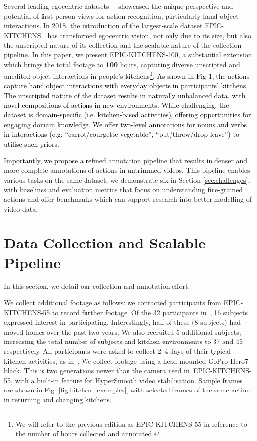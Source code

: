 \documentclass[twocolumn]{svjour3}          \smartqed
\newcommand{\chParagraph}[1]{\noindent {\textbf{#1.}} \hspace{6pt}}
\newcommand{\edits}[1]{\textcolor{black}{#1}}
\newcommand {\oldDataset} {EPIC-KITCHENS-55{}}
\newcommand {\newDataset} {EPIC-KITCHENS-100}
\begin{document}
Several leading egocentric datasets~~\cite{Pirsiavash2012,Damen2014a,Fathi2012,de2008guide,EGTEA} showcased the unique perspective and potential of first-person views for action recognition, particularly hand-object interactions.
In 2018, the introduction of the largest-scale dataset EPIC-KITCHENS~\cite{Damen2018EPICKITCHENS}\ has transformed egocentric vision, not only due to its size, but also the unscripted nature of its collection and the scalable nature of the collection pipeline.
In this paper, we present \newDataset, a substantial extension which brings the total footage to \textbf{100} hours, capturing diverse unscripted and unedited object interactions in people's kitchens\footnote{We will refer to the previous edition as EPIC-KITCHENS-55 in reference to the number of hours collected and annotated.}. 
\edits{As shown in Fig 1, the actions capture hand object interactions with everyday objects in participants' kitchens. The unscripted nature of the dataset results in naturally unbalanced data, with novel compositions of actions in new environments. While challenging, the dataset is domain-specific (i.e. kitchen-based activities), offering opportunities for engaging domain knowledge. We offer two-level annotations for nouns and verbs in interactions (e.g. ``carrot/courgette  vegetable'', ``put/throw/drop  leave'') to utilise such priors.}

\edits{Importantly, we propose a refined} annotation pipeline that results in denser and more complete annotations of actions \edits{in untrimmed videos.}
This pipeline enables various tasks on the same dataset; we demonstrate six in Section \ref{sec:challenges}, with baselines and evaluation metrics that
focus on understanding fine-grained actions and offer benchmarks which can support research into better modelling of video data.


\section{Data Collection and Scalable Pipeline}
\label{sec:data_collection_pipeline}
In this section, we detail our collection and annotation effort. 

\chParagraph{Data Collection}
We collect additional footage as follows:
we contacted participants from \oldDataset{} to record further footage.
Of the 32 participants in~\cite{Damen2018EPICKITCHENS}, 16 subjects expressed interest in participating. Interestingly, half of these (8 subjects) had moved homes over the past two years.
We also recruited 5 additional subjects, increasing the total number of subjects and kitchen environments to 37 and 45 respectively.
All participants were asked to collect 2--4 days of their typical kitchen activities, as in~\cite{Damen2018EPICKITCHENS}.
We collect footage using a head mounted GoPro Hero7 black. This is two generations newer than the camera used in~\oldDataset, with a built-in feature for HyperSmooth video stabilisation. 
Sample frames are shown in Fig. \ref{fig:kitchen_examples}, with selected frames of the same action in returning and changing kitchens.
\end{document}
